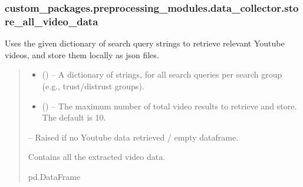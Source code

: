 \documentclass[letterpaper,10pt,english]{sphinxhowto}
\begin{document}
\sphinxstepscope


\subsubsection{custom\_packages.preprocessing\_modules.data\_collector.store\_all\_video\_data}
\label{\detokenize{_autosummary/custom_packages.preprocessing_modules.data_collector.store_all_video_data:custom-packages-preprocessing-modules-data-collector-store-all-video-data}}\label{\detokenize{_autosummary/custom_packages.preprocessing_modules.data_collector.store_all_video_data::doc}}

\begin{fulllineitems}
\label{\detokenize{_autosummary/custom_packages.preprocessing_modules.data_collector.store_all_video_data:custom_packages.preprocessing_modules.data_collector.store_all_video_data}}
\pysigstartsignatures
\pysiglinewithargsret
{}
{\sphinxparamcomma {}}
{}
\pysigstopsignatures
\sphinxAtStartPar
Uses the given dictionary of search query strings to retrieve relevant Youtube videos,
and store them locally as json files.
\begin{quote}\begin{description}
\begin{itemize}
\item {} 
\sphinxAtStartPar
{} () – A dictionary of strings, for all search queries per search group (e.g., trust/distrust groups).

\item {} 
\sphinxAtStartPar
{} (\sphinxstyleliteralemphasis{\sphinxupquote{, }}) – The maximum number of total video results to retrieve and store.
The default is 10.

\end{itemize}

\sphinxAtStartPar
{} – Raised if no Youtube data retrieved / empty dataframe.

\sphinxAtStartPar
Contains all the extracted video data.

\sphinxAtStartPar
pd.DataFrame

\end{description}\end{quote}

\end{fulllineitems}
\end{document}

